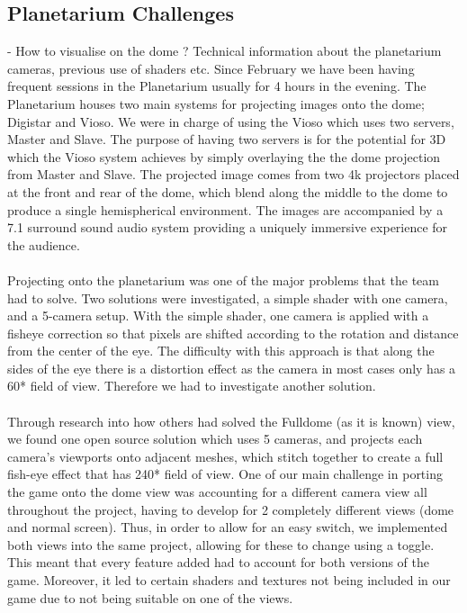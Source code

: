 \documentclass[11pt,a4paper]{article}
\begin{document}
    \subsection{Planetarium Challenges}
     - How to visualise on the dome ? Technical information about the planetarium cameras, previous use of shaders etc.
     Since February we have been having frequent sessions in the Planetarium usually for 4 hours in the evening. The Planetarium houses two main systems for projecting images onto the dome; Digistar and Vioso. We were in charge of using the Vioso which uses two servers, Master and Slave. The purpose of having two servers is for the potential for 3D which the Vioso system achieves by simply overlaying the the dome projection from Master and Slave.
     The projected image comes from two 4k projectors placed at the front and rear of the dome, which blend along the middle to the dome to produce a single hemispherical environment. The images are accompanied by a 7.1 surround sound audio system providing a uniquely immersive experience for the audience.  \\ \\ 
     Projecting onto the planetarium was one of the major problems that the team had to solve. Two solutions were investigated, a simple shader with one camera, and a 5-camera setup. 
     With the simple shader, one camera is applied with a fisheye correction so that pixels are shifted according to the rotation and distance from the center of the eye. The difficulty with this approach is that along the sides of the eye there is a distortion effect as the camera in most cases only has a 60* field of view. Therefore we had to investigate another solution. \\ \\
     Through research into how others had solved the Fulldome (as it is known) view, we found one open source solution which uses 5 cameras, and projects each camera's viewports onto adjacent meshes, which stitch together to create a full fish-eye effect that has 240* field of view.
     One of our main challenge in porting the game onto the dome view was accounting for a different camera view all throughout the project, having to develop for 2 completely different views (dome and normal screen). Thus, in order to allow for an easy switch, we implemented both views into the same project, allowing for these to change using a toggle. This meant that every feature added had to account for both versions of the game. Moreover, it led to certain shaders and textures not being included in our game due to not being suitable on one of the views.
      \pagebreak
\end{document}
